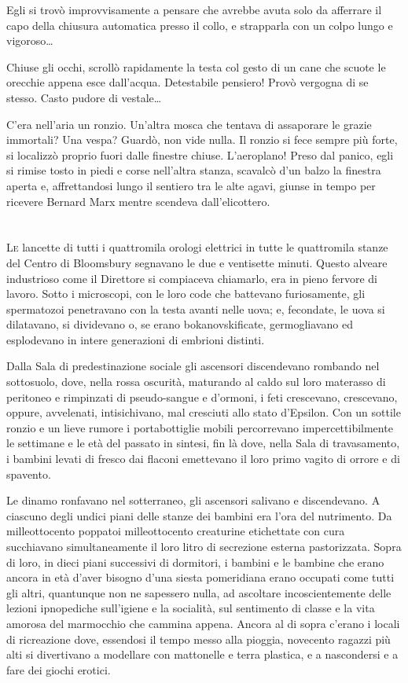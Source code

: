 \documentclass[
a5paper, %
10pt, %
twoside, 
onecolumn, %
openany, %
]{memoir}
\begin{document}
Egli si trovò improvvisamente a pensare che avrebbe avuta solo da afferrare il capo della chiusura automatica presso il collo, e strapparla con un colpo lungo e vigoroso…

Chiuse gli occhi, scrollò rapidamente la testa col gesto di un cane che scuote le orecchie appena esce dall’acqua. Detestabile pensiero! Provò vergogna di se stesso. Casto pudore di vestale…

C’era nell’aria un ronzio. Un’altra mosca che tentava di assaporare le grazie immortali? Una vespa? Guardò, non vide nulla. Il ronzio si fece sempre più forte, si localizzò proprio fuori dalle finestre chiuse. L’aeroplano! Preso dal panico, egli si rimise tosto in piedi e corse nell’altra stanza, scavalcò d’un balzo la finestra aperta e, affrettandosi lungo il sentiero tra le alte agavi, giunse in tempo per ricevere Bernard Marx mentre scendeva dall’elicottero.

\chapter{\phantom{title}}

\lettrine{L}e lancette di tutti i quattromila orologi elettrici in tutte le quattromila stanze del Centro di Bloomsbury segnavano le due e ventisette minuti. Questo alveare industrioso come il Direttore si compiaceva chiamarlo, era in pieno fervore di lavoro. Sotto i microscopi, con le loro code che battevano furiosamente, gli spermatozoi penetravano con la testa avanti nelle uova; e, fecondate, le uova si dilatavano, si dividevano o, se erano bokanovskificate, germogliavano ed esplodevano in intere generazioni di embrioni distinti.

Dalla Sala di predestinazione sociale gli ascensori discendevano rombando nel sottosuolo, dove, nella rossa oscurità, maturando al caldo sul loro materasso di peritoneo e rimpinzati di pseudo-sangue e d’ormoni, i feti crescevano, crescevano, oppure, avvelenati, intisichivano, mal cresciuti allo stato d’Epsilon. Con un sottile ronzio e un lieve rumore i portabottiglie mobili percorrevano impercettibilmente le settimane e le età del passato in sintesi, fin là dove, nella Sala di travasamento, i bambini levati di fresco dai flaconi emettevano il loro primo vagito di orrore e di spavento.

Le dinamo ronfavano nel sotterraneo, gli ascensori salivano e discendevano. A ciascuno degli undici piani delle stanze dei bambini era l’ora del nutrimento. Da milleottocento poppatoi milleottocento creaturine etichettate con cura succhiavano simultaneamente il loro litro di secrezione esterna pastorizzata. Sopra di loro, in dieci piani successivi di dormitori, i bambini e le bambine che erano ancora in età d’aver bisogno d’una siesta pomeridiana erano occupati come tutti gli altri, quantunque non ne sapessero nulla, ad ascoltare incoscientemente delle lezioni ipnopediche sull’igiene e la socialità, sul sentimento di classe e la vita amorosa del marmocchio che cammina appena. Ancora al di sopra c’erano i locali di ricreazione dove, essendosi il tempo messo alla pioggia, novecento ragazzi più alti si divertivano a modellare con mattonelle e terra plastica, e a nascondersi e a fare dei giochi erotici.
\end{document}
